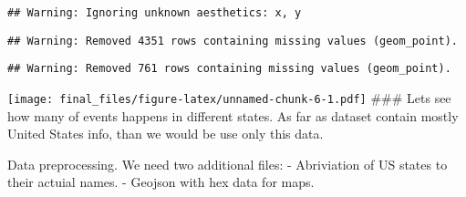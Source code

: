 \documentclass[]{article}
\begin{document}
\begin{verbatim}
## Warning: Ignoring unknown aesthetics: x, y
\end{verbatim}

\begin{verbatim}
## Warning: Removed 4351 rows containing missing values (geom_point).
\end{verbatim}

\begin{verbatim}
## Warning: Removed 761 rows containing missing values (geom_point).
\end{verbatim}

\texttt{[image: final\_files/figure-latex/unnamed-chunk-6-1.pdf]} \#\#\#
Lets see how many of events happens in different states. As far as
dataset contain mostly United States info, than we would be use only
this data.

Data preprocessing. We need two additional files: - Abriviation of US
states to their actuial names. - Geojson with hex data for maps.
\end{document}
